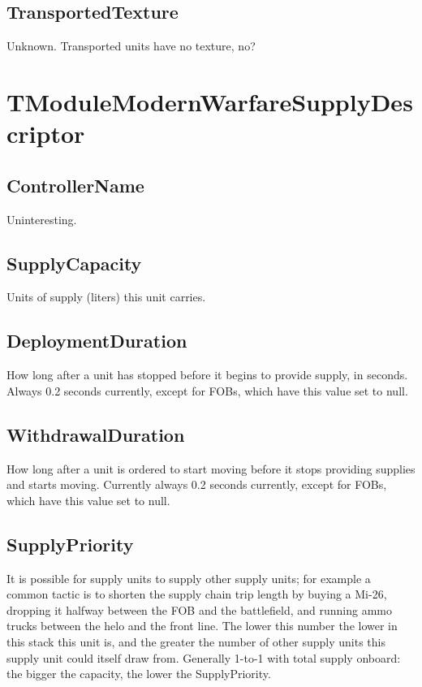 \documentclass{article}
\begin{document}
\subsection{TransportedTexture}

Unknown. Transported units have no texture, no?

\section{TModuleModernWarfareSupplyDescriptor}

\subsection{ControllerName}

Uninteresting.

\subsection{SupplyCapacity}

Units of supply (liters) this unit carries.

\subsection{DeploymentDuration}

How long after a unit has stopped before it begins to provide supply, in seconds. Always 0.2 seconds currently, except for FOBs, which have this value set to null.

\subsection{WithdrawalDuration}

How long after a unit is ordered to start moving before it stops providing supplies and starts moving. Currently always 0.2 seconds currently, except for FOBs, which have this value set to null.

\subsection{SupplyPriority}

It is possible for supply units to supply other supply units; for example a common tactic is to shorten the supply chain trip length by buying a Mi-26, dropping it halfway between the FOB and the battlefield, and running ammo trucks between the helo and the front line. The lower this number the lower in this stack this unit is, and the greater the number of other supply units this supply unit could itself draw from. Generally 1-to-1 with total supply onboard: the bigger the capacity, the lower the SupplyPriority.
\end{document}
